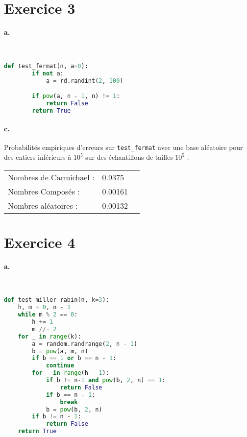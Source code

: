 \documentclass[french]{article}
\begin{document}
\section*{Exercice 3}
\paragraph{a.} \
\begin{lstlisting}[language=Python, belowskip=-1 \baselineskip]
    def test_fermat(n, a=0):
        if not a:
            a = rd.randint(2, 100)

        if pow(a, n - 1, n) != 1:
            return False
        return True
\end{lstlisting}
\paragraph{c.} Probabilités empiriques d'erreurs sur  \verb|test_fermat| avec une base aléatoire pour des entiers inférieurs à $10^5$ sur des échantillons de tailles $10^5$ :\\
\begin{center}

\begin{tabular}{lll}
    Nombres de Carmichael :&0.9375\\
    Nombres Composés : & 0.00161\\
    Nombres aléatoires : &0.00132\\
\end{tabular}

\end{center}
\newpage
\section*{Exercice 4}
\paragraph{a.} \
\begin{lstlisting}[language=Python, belowskip=-1 \baselineskip]
def test_miller_rabin(n, k=3):
    h, m = 0, n - 1
    while m % 2 == 0:
        h += 1
        m //= 2
    for _ in range(k):
        a = random.randrange(2, n - 1)
        b = pow(a, m, n)
        if b == 1 or b == n - 1:
            continue
        for _ in range(h - 1):
            if b != n-1 and pow(b, 2, n) == 1:
                return False
            if b == n - 1:
                break
            b = pow(b, 2, n)
        if b != n - 1:
            return False
    return True
\end{lstlisting} 
\end{document}
